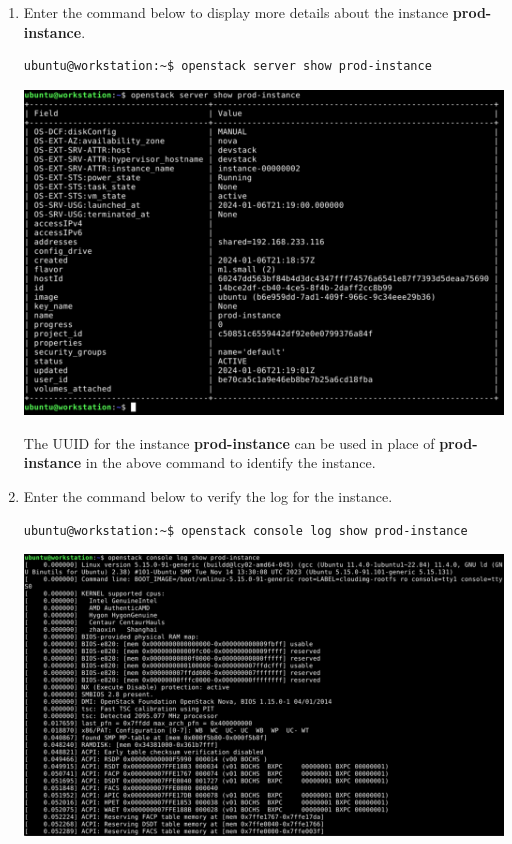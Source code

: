 \documentclass[letterpaper, 12pt]{article}
\begin{document}
\begin{enumerate}
    \item Enter the command below to display more details about the instance \textbf{prod-instance}.
\begin{lstlisting}
ubuntu@workstation:~$ openstack server show prod-instance
\end{lstlisting}

    \begin{center}
        \includegraphics[width=\linewidth]{images/part2/step13.png}
    \end{center}

    \begin{tipbox}
        The UUID for the instance \textbf{prod-instance} can be used in place of \textbf{prod-instance} in the above
        command to identify the instance.
    \end{tipbox}

    \item Enter the command below to verify the log for the instance.
\begin{lstlisting}
ubuntu@workstation:~$ openstack console log show prod-instance
\end{lstlisting}

    \begin{center}
        \includegraphics[width=\linewidth]{images/part2/step14.png}
    \end{center}


\end{enumerate}
\end{document}

